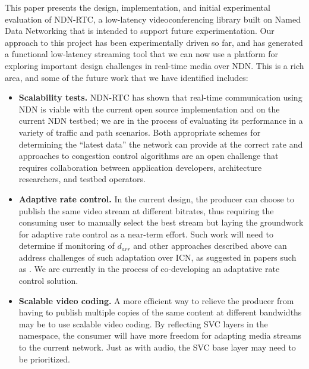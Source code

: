 \documentclass{icn/sig-alternate-2013} %
\newcommand{\ndnrtcName}{NDN-RTC} %
\begin{document}
This paper presents the design, implementation, and initial experimental evaluation of \ndnrtcName{}, a low-latency videoconferencing library built on Named Data Networking that is intended to support future experimentation.   Our approach to this project has been experimentally driven so far, and has generated a functional low-latency streaming tool that we can now use a platform for exploring important design challenges in real-time media over NDN.  This is a rich area, and some of the future work that we have identified includes: 
\begin{itemize}[label={}]

\item \textbf{Scalability tests.} \ndnrtcName{} has shown that real-time communication using NDN is viable with the current open source implementation and on the current NDN testbed;  we are in the process of evaluating its performance in a variety of traffic and path scenarios. Both appropriate schemes for determining the ``latest data'' the network can provide at the correct rate and approaches to congestion control algorithms are an open challenge that requires collaboration between application developers,  architecture researchers, and testbed operators.  

\item \textbf{Adaptive rate control.} In the current design, the producer can choose to publish the same video stream at different bitrates, thus requiring the consuming user to manually select the best stream but laying the groundwork for adaptive rate control as a near-term effort. Such work will need to determine if monitoring of $d_{arr}$ and other approaches described above can address challenges of such adaptation over ICN, as suggested in papers such as \cite{posch2014client}.  We are currently in the process of co-developing an adaptative rate control solution. 


\item \textbf{Scalable video coding.} A more efficient way to relieve the producer from having to publish multiple copies of the same content at different bandwidths may be to use scalable video coding. By reflecting SVC layers in the namespace, the consumer will have more freedom for adapting media streams to the current network. Just as with audio, the SVC base layer may need to be prioritized. 


\end{itemize}
\end{document}
